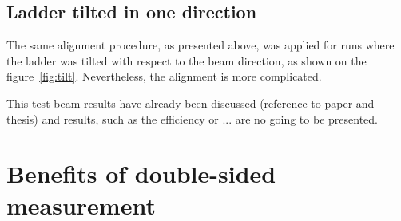     \subsection{Ladder tilted in one direction}

      The same alignment procedure, as presented above, was applied for runs where the ladder was tilted with respect to the beam direction, as shown on the figure~\ref{fig:tilt}.
      Nevertheless, the alignment is more complicated.

    
    This test-beam results have already been discussed (reference to paper and thesis) and results, such as the efficiency or ... are no going to be presented.

    \begin{figure}
    \end{figure}

    \begin{figure}
    \end{figure}

    \begin{figure}
    \end{figure}

    \begin{figure}
    \end{figure}
    
  \section{Benefits of double-sided measurement}

